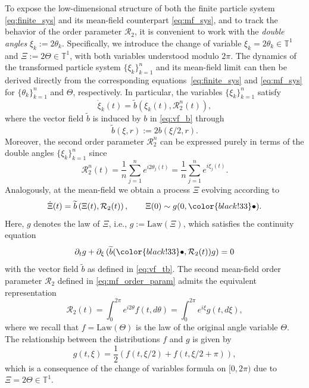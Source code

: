 \documentclass[10pt]{article}
\theoremstyle{definition}
\theoremstyle{definition}
\numberwithin{equation}{section}
\newcommand{\BBT}{\mathbb{T}}
\newcommand{\CR}{\mathcal{R}}
\newcommand{\Law}{\mathrm{Law}}
\newcommand{\dummy}{\mathord{\color{black!33}\bullet}}
\newcommand{\Dxi}{\Dot{\xi}}
\newcommand{\tb}{\widetilde{b}}
\begin{document}
To expose the low-dimensional structure of both the finite particle system \eqref{eq:finite_sys} and its mean-field counterpart \eqref{eq:mf_sys}, and to track the behavior of the order parameter $\CR_2$, it is convenient to work with the \emph{double angles} $\xi_k:=2\theta_k$.
Specifically, we introduce the change of variable $\xi_k = 2\theta_k \in \BBT^1$ and $\Xi := 2\Theta \in \BBT^1$, with both variables understood modulo $2\pi$. 
The dynamics of the transformed particle system $\{\xi_k\}_{k=1}^n$ and its mean-field limit can then be derived directly from the corresponding equations~\eqref{eq:finite_sys} and \eqref{eq:mf_sys} for $\{\theta_k\}_{k=1}^n$ and $\Theta$, respectively.
In particular, the variables $\{\xi_k\}_{k=1}^n$ satisfy
\begin{equation}\label{eq:xi_finite_sys}
\Dxi_k(t) = \tb \left(\xi_k(t), \CR_2^n(t) \right),
\end{equation}
where the vector field $\tb$ is induced by $b$ in \eqref{eq:vf_b} through
\begin{equation}
    \label{eq:vf_tb}
\tb (\xi, r) := 2 b (\xi/2, r).
\end{equation}
Moreover, the second order parameter $\CR_2^n$ can be expressed purely in terms of the double angles $\{\xi_k\}_{k=1}^n$ since
\begin{equation}\label{eq:order_param_finite_in_xi}
\CR_2^n(t) = \frac{1}{n} \sum_{j=1}^n e^{i2\theta_j(t)} = \frac{1}{n} \sum_{j=1}^n e^{i\xi_j(t)}.
\end{equation}
Analogously, at the mean-field we obtain a process $\Xi$ evolving according to
\begin{equation}\label{eq:xi_mf_sys}
\Dot{\Xi} (t) = \tb \left( \Xi (t), \CR_2(t) \right), \qquad \Xi(0) \sim g(0, \dummy).
\end{equation}
Here, $g$ denotes the law of $\Xi$, i.e., $g := \Law (\Xi)$, which satisfies the continuity equation
\begin{equation}
\partial_t g + \partial_{\xi}\, ( \tb(\dummy, \CR_2(t)) g ) = 0
\label{eqn:ContEqDoubled}
\end{equation}
with the vector field $\tb$ as defined in \eqref{eq:vf_tb}.
The second mean-field order parameter $\CR_2$ defined in \eqref{eq:mf_order_param} admits the equivalent representation
\begin{equation}\label{eq:order_param_mf_in_xi}
\CR_2(t) = \int_0^{2\pi} e^{i2\theta} f(t, d\theta) = \int_0^{2\pi} e^{i\xi} g (t, d\xi),
\end{equation}
where we recall that $f = \Law(\Theta)$ is the law of the original angle variable $\Theta$.
The relationship between the distributions $f$ and $g$ is given by
\begin{equation}\label{eq:relation_f_and_g}
g(t, \xi) = \frac{1}{2} \left( f(t, \xi/2) + f(t, \xi/2 + \pi) \right),
\end{equation}
which is a consequence of the change of variables formula on $[0, 2\pi)$ due to $\Xi = 2\Theta \in \BBT^1$.
\end{document}

